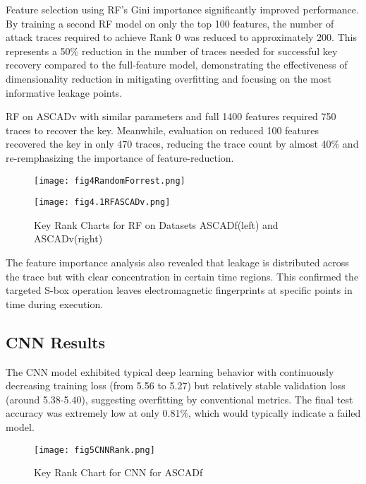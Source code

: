 \documentclass[runningheads]{llncs}
\begin{document}
Feature selection using RF's Gini importance significantly improved performance. By training a second RF model on only the top 100 features, the number of attack traces required to achieve Rank 0 was reduced to approximately 200. This represents a 50\% reduction in the number of traces needed for successful key recovery compared to the full-feature model, demonstrating the effectiveness of dimensionality reduction in mitigating overfitting and focusing on the most informative leakage points.

RF on ASCADv with similar parameters and full 1400 features required 750 traces to recover the key. Meanwhile, evaluation on reduced 100 features recovered the key in only 470 traces, reducing the trace count by almost 40\% and re-remphasizing the importance of feature-reduction. 

\begin{figure}[htbp]
    \centering
    \begin{minipage}[b]{0.48\textwidth}
        \centering
        \texttt{[image: fig4RandomForrest.png]}
    \end{minipage}
    \hfill
    \begin{minipage}[b]{0.48\textwidth}
        \centering
        \texttt{[image: fig4.1RFASCADv.png]}
    \end{minipage}
    \caption{Key Rank Charts for RF on Datasets ASCADf(left) and ASCADv(right)}
    \label{fig:rf_key_rank_combined}
\end{figure}


The feature importance analysis also revealed that leakage is distributed across the trace but with clear concentration in certain time regions. This confirmed the targeted S-box operation leaves electromagnetic fingerprints at specific points in time during execution.


\subsection{CNN Results}
The CNN model exhibited typical deep learning behavior with continuously decreasing training loss (from 5.56 to 5.27) but relatively stable validation loss (around 5.38-5.40), suggesting overfitting by conventional metrics. The final test accuracy was extremely low at only 0.81\%, which would typically indicate a failed model.
\begin{figure}[htbp]
    \centering
    \texttt{[image: fig5CNNRank.png]}
    \caption{Key Rank Chart for CNN for ASCADf}
    \label{fig:cnn_key_rank}
\end{figure}
\end{document}
